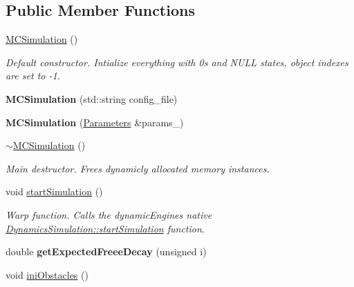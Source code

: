 \subsection*{Public Member Functions}
\begin{DoxyCompactItemize}
\item 
\hyperlink{class_m_c_simulation_a89f56682a13f0bcb2c53d191ca336e35}{M\+C\+Simulation} ()
\begin{DoxyCompactList}\small\item\em Default constructor. Intialize everything with 0\textquotesingle{}s and N\+U\+LL states, object indexes are set to -\/1. \end{DoxyCompactList}\item 
\mbox{\label{class_m_c_simulation_a5b2bdb95de31810a0d2ee54174e83f98}} 
{\bfseries M\+C\+Simulation} (std\+::string config\+\_\+file)
\item 
\mbox{\label{class_m_c_simulation_a76ac3d50d345d249cacc913273b2bd34}} 
{\bfseries M\+C\+Simulation} (\hyperlink{class_parameters}{Parameters} \&params\+\_\+)
\item 
\mbox{\label{class_m_c_simulation_a859c6ddce0e3c07db0159b2e4906b7ca}} 
\hyperlink{class_m_c_simulation_a859c6ddce0e3c07db0159b2e4906b7ca}{$\sim$\+M\+C\+Simulation} ()
\begin{DoxyCompactList}\small\item\em Main destructor. Frees dynamicly allocated memory instances. \end{DoxyCompactList}\item 
void \hyperlink{class_m_c_simulation_aa305f18bd48dd26f916cc9c006a8dec8}{start\+Simulation} ()
\begin{DoxyCompactList}\small\item\em Warp function. Calls the dynamic\+Engine\textquotesingle{}s native \hyperlink{class_dynamics_simulation_a820ee541ac42b1f9d08f5aef571eccc7}{Dynamics\+Simulation\+::start\+Simulation} function. \end{DoxyCompactList}\item 
\mbox{\label{class_m_c_simulation_aff302334b2743a583b5d6f642d841f2f}} 
double {\bfseries get\+Expected\+Freee\+Decay} (unsigned i)
\item 
void \hyperlink{class_m_c_simulation_aa60234e3f6d2a100c8b03e4f304b07f4}{ini\+Obstacles} ()
\end{DoxyCompactItemize}
